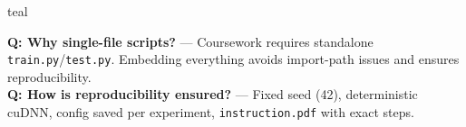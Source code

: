 \documentclass[11pt,a4paper]{article}
\begin{document}
\begin{speakerbox}{teal}
\begin{anticipatedqa}
\textbf{Q: Why single-file scripts?} --- Coursework requires standalone \texttt{train.py}/\texttt{test.py}. Embedding everything avoids import-path issues and ensures reproducibility. \\
\textbf{Q: How is reproducibility ensured?} --- Fixed seed (42), deterministic cuDNN, config saved per experiment, \texttt{instruction.pdf} with exact steps.
\end{anticipatedqa}

\end{speakerbox}

\vspace{6pt}

\end{document}
